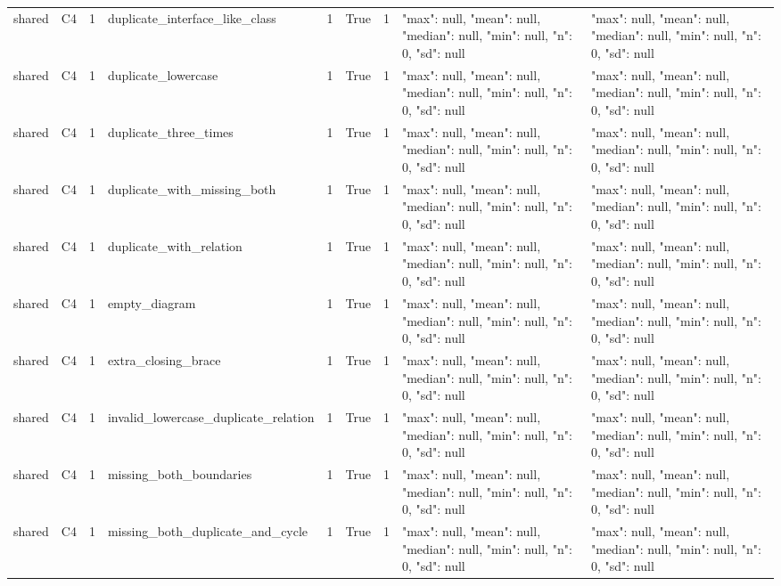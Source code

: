 \begin{tabular}{lllllllll}
shared & C4 & 1 & duplicate\_interface\_like\_class & 1 & True & 1 & {"max": null, "mean": null, "median": null, "min": null, "n": 0, "sd": null} & {"max": null, "mean": null, "median": null, "min": null, "n": 0, "sd": null} \\
shared & C4 & 1 & duplicate\_lowercase & 1 & True & 1 & {"max": null, "mean": null, "median": null, "min": null, "n": 0, "sd": null} & {"max": null, "mean": null, "median": null, "min": null, "n": 0, "sd": null} \\
shared & C4 & 1 & duplicate\_three\_times & 1 & True & 1 & {"max": null, "mean": null, "median": null, "min": null, "n": 0, "sd": null} & {"max": null, "mean": null, "median": null, "min": null, "n": 0, "sd": null} \\
shared & C4 & 1 & duplicate\_with\_missing\_both & 1 & True & 1 & {"max": null, "mean": null, "median": null, "min": null, "n": 0, "sd": null} & {"max": null, "mean": null, "median": null, "min": null, "n": 0, "sd": null} \\
shared & C4 & 1 & duplicate\_with\_relation & 1 & True & 1 & {"max": null, "mean": null, "median": null, "min": null, "n": 0, "sd": null} & {"max": null, "mean": null, "median": null, "min": null, "n": 0, "sd": null} \\
shared & C4 & 1 & empty\_diagram & 1 & True & 1 & {"max": null, "mean": null, "median": null, "min": null, "n": 0, "sd": null} & {"max": null, "mean": null, "median": null, "min": null, "n": 0, "sd": null} \\
shared & C4 & 1 & extra\_closing\_brace & 1 & True & 1 & {"max": null, "mean": null, "median": null, "min": null, "n": 0, "sd": null} & {"max": null, "mean": null, "median": null, "min": null, "n": 0, "sd": null} \\
shared & C4 & 1 & invalid\_lowercase\_duplicate\_relation & 1 & True & 1 & {"max": null, "mean": null, "median": null, "min": null, "n": 0, "sd": null} & {"max": null, "mean": null, "median": null, "min": null, "n": 0, "sd": null} \\
shared & C4 & 1 & missing\_both\_boundaries & 1 & True & 1 & {"max": null, "mean": null, "median": null, "min": null, "n": 0, "sd": null} & {"max": null, "mean": null, "median": null, "min": null, "n": 0, "sd": null} \\
shared & C4 & 1 & missing\_both\_duplicate\_and\_cycle & 1 & True & 1 & {"max": null, "mean": null, "median": null, "min": null, "n": 0, "sd": null} & {"max": null, "mean": null, "median": null, "min": null, "n": 0, "sd": null} \\

\end{tabular}
